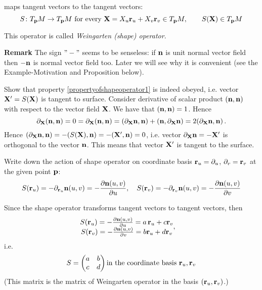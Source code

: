 \documentclass[12pt]{article}
\theoremstyle{theorem}
\numberwithin{equation}{section}
\begin{document}
{ maps tangent vectors to the tangent vectors:
\begin{equation}\label{propertyofshapeoperator1}
  S\colon T_{\bf p} M\to T_{\bf p} M\,\, \hbox{for every}\,\, 
 {\bf X}=X_u{\bf r}_u+X_v{\bf r}_v\in T_{\bf p} M,
\qquad S({\bf X})\in T_{\bf p} M
\end{equation}


This operator is called  {\it Weingarten (shape) operator}.






\m
{\footnotesize
{\bf Remark} The sign $"-"$ seems to be senseless: if ${\bf n}$ is unit normal vector field then $-{\bf n}$
is normal vector field too. Later we will see why it is convenient 
(see the Example-Motivation and Proposition below).
}

   Show that  property  \eqref{propertyofshapeoperator1} is 
  indeed obeyed, i.e.
   vector ${\bf X}'=S({\bf X})$ is tangent to surface.  Consider derivative of scalar product $({\bf n},{\bf n})$
with respect to the vector field ${\bf X}$. We have that $({\bf n},{\bf n})=1$. Hence
                 $$
   \partial_{\bf X}({\bf n},{\bf n})=0=\partial_{\bf X} ({\bf n},{\bf n})=(\partial_{\bf X} {\bf n},{\bf n})+({\bf n},\partial_{\bf X} {\bf n})=2(\partial_{\bf X} {\bf n},{\bf n})\,.
              $$
   Hence $(\partial_{\bf X} {\bf n},{\bf n})=-(S({\bf X}),{\bf n})=-({\bf X}',{\bf n})=0$, i.e. vector
$\partial_{\bf X} {\bf n}=-{\bf X}'$ is orthogonal to the vector ${\bf n}$. This means that vector ${\bf X}'$ is
tangent to the surface.

Write down the action of shape operator on coordinate basis ${\bf r}_u=\partial_u$, $\partial_v={\bf r}_v$ at
the given point ${\bf p}$:
\begin{equation*}
S({\bf r}_u)=-\partial_{{\bf r}_u}{\bf n}(u,v)=-{\partial {\bf n}(u,v)\over \partial u},\quad
S({\bf r}_v)=-\partial_{{\bf r}_v}{\bf n}(u,v)=-{\partial {\bf n}(u,v)\over \partial v}
\end{equation*}


Since the shape operator transforms tangent vectors to tangent vectors, then
\begin{equation*}\label{propertyofshapeoperator-1}
\begin {matrix}
S({\bf r}_u)=-{\partial {\bf n}(u,v)\over \partial u}=a\,{\bf r}_u+c {\bf r}_v \cr
S({\bf r}_v)=-{\partial {\bf n}(u,v)\over \partial v}=b{\bf r}_u+d{\bf r}_v\cr
\end{matrix},\quad
  \end{equation*}
  i.e.
  \begin{equation}\label{propertyofshapeoperator2}
                       S
   =\begin{pmatrix}
   a &b\cr c& d\cr
   \end{pmatrix}
      \hbox {in the coordinate basis ${\bf r}_u,{\bf r}_v$}
\end{equation}
(This matrix is the matrix of Weingarten operator in the basis
   $({\bf r}_u,{\bf r}_v)$.)

}
\end{document}
